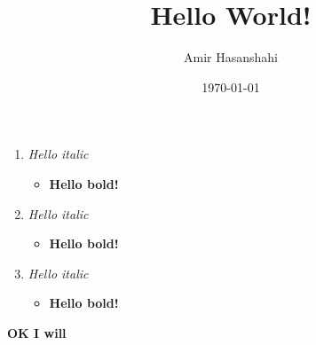 \documentclass{article}
\title{Hello World!}
\author{Amir Hasanshahi}
\date{\today}
\begin{document}
	\maketitle
	\lipsum[1-2]

	\begin{enumerate}
		\item \textit{Hello italic}
			\begin{itemize}
				\item \textbf{Hello bold!}
			\end{itemize}

		\item \textit{Hello italic}
			\begin{itemize}
				\item \textbf{Hello bold!}
			\end{itemize}

		\item \textit{Hello italic}
			\begin{itemize}
				\item \textbf{Hello bold!}
			\end{itemize}
	\end{enumerate}

	\textbf{OK I will}
\end{document}
